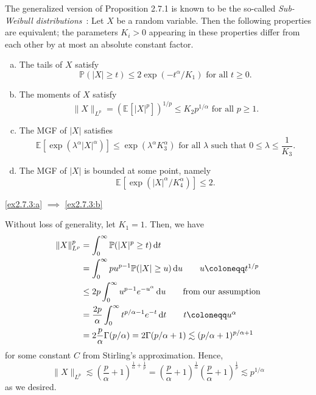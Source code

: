 \begin{answer}
	The generalized version of Proposition 2.7.1 is known to be the so-called \emph{Sub-Weibull distributions}~\cite{Vladimirova_2020}: Let \(X\) be a random variable. Then the following properties are equivalent; the parameters \(K_i > 0\) appearing in these properties differ from each other by at most an absolute constant factor.
	\begin{enumerate}[(a)]
		\item\label{ex2.7.3:a} The tails of \(X\) satisfy
		      \[
			      \mathbb{P} (\vert X \vert \geq t)
			      \leq 2 \exp (- t^\alpha / K_1) \text{ for all } t \geq 0.
		      \]
		\item\label{ex2.7.3:b} The moments of \(X\) satisfy
		      \[
			      \lVert X \rVert _{L^p}
			      = (\mathbb{E}_{}[\vert X \vert ^p] )^{1 / p}
			      \leq K_2 p^{1 / \alpha } \text{ for all } p \geq 1.
		      \]
		\item\label{ex2.7.3:c} The MGF of \(\vert X \vert \) satisfies
		      \[
			      \mathbb{E}_{}[\exp (\lambda ^\alpha \vert X \vert ^\alpha )]
			      \leq \exp (\lambda ^\alpha K_3^\alpha ) \text{ for all \(\lambda \) such that } 0 \leq \lambda \leq \frac{1}{K_3} .
		      \]
		\item\label{ex2.7.3:d} The MGF of \(\vert X \vert \) is bounded at some point, namely
		      \[
			      \mathbb{E}_{}[\exp (\vert X \vert ^\alpha / K_4^\alpha )] \leq 2.
		      \]
	\end{enumerate}

	\begin{claim}
		\autoref{ex2.7.3:a} \(\implies \) \autoref{ex2.7.3:b}
	\end{claim}
	\begin{explanation}
		Without loss of generality, let \(K_1 = 1\). Then, we have
		\begin{align*}
			\lVert X \rVert _{L^p} ^p
			 & = \int_{0}^{\infty} \mathbb{P} (\vert X \vert ^p \geq t) \,\mathrm{d}t                                           \\
			 & = \int_{0}^{\infty} p u^{p-1} \mathbb{P} (\vert X \vert \geq u) \,\mathrm{d}u \tag*{\(u \coloneqq t^{1 / p}\)}   \\
			 & \leq 2p \int_{0}^{\infty} u^{p-1} e^{-u^\alpha } \,\mathrm{d}u \tag*{from our assumption}                        \\
			 & = \frac{2p}{\alpha } \int_{0}^{\infty} t^{p / \alpha - 1} e^{- t} \,\mathrm{d}t \tag*{\(t \coloneqq u^\alpha \)} \\
			 & = 2 \frac{p}{\alpha } \Gamma (p / \alpha )
			= 2 \Gamma (p / \alpha + 1)
			\lesssim (p / \alpha + 1)^{p / \alpha + 1}
		\end{align*}
		for some constant \(C\) from Stirling's approximation. Hence,
		\[
			\lVert X \rVert _{L^p}
			\lesssim \left( \frac{p}{\alpha } + 1 \right) ^{\frac{1}{\alpha } + \frac{1}{p}}
			= \left( \frac{p}{\alpha } + 1 \right) ^{\frac{1}{\alpha }} \left( \frac{p}{\alpha } + 1 \right)^{\frac{1}{p}}
			\lesssim p^{1 / \alpha }
		\]
		as we desired.
	\end{explanation}


\end{answer}
